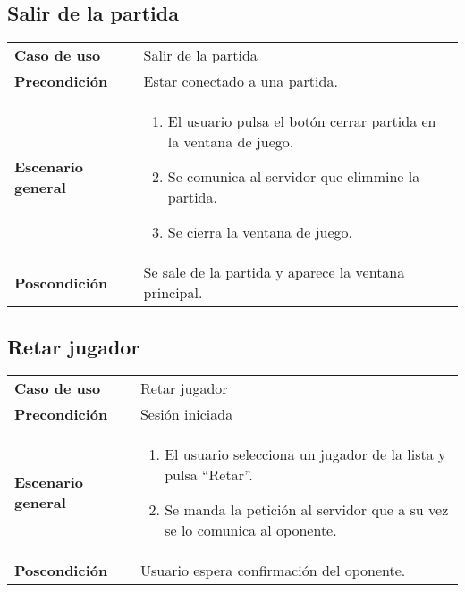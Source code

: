 \subsection{Salir de la partida}
{\footnotesize
\begin{tabularx}{0.95\textwidth}{p{}|X}

\textbf{Caso de uso} & Salir de la partida \\

\textbf{Precondición} & Estar conectado a una partida.\\

\textbf{Escenario general} & \begin{enumerate}
\item El usuario pulsa el botón cerrar partida en la ventana de juego.
\item Se comunica al servidor que elimmine la partida.
\item Se cierra la ventana de juego.

\end{enumerate} \\

\textbf{Poscondición} & Se sale de la partida y aparece la ventana principal.

\end{tabularx}
}

\subsection{Retar jugador}
{\footnotesize
\begin{tabularx}{0.95\textwidth}{p{}|X}

\textbf{Caso de uso} & Retar jugador \\

\textbf{Precondición} & Sesión iniciada \\

\textbf{Escenario general} & \begin{enumerate}
\item El usuario selecciona un jugador de la lista y pulsa ``Retar''.
\item Se manda la petición al servidor que a su vez se lo comunica al oponente.

\end{enumerate} \\

\textbf{Poscondición} & Usuario espera confirmación del oponente.

\end{tabularx}
}

